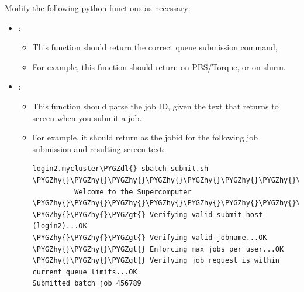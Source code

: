 \documentclass[letterpaper,10pt,english]{sphinxmanual}
\def\PYGZgt{\char`\>}
\def\PYGZdl{\char`\$}
\def\PYGZhy{\char`\-}
\begin{document}
Modify the following python functions as necessary:
\begin{itemize}
\item {} 
:
\begin{itemize}
\item {} 
This function should return the correct queue submission command,

\item {} 
For example, this function should return  on PBS/Torque, or  on slurm.

\end{itemize}

\item {} 
:
\begin{itemize}
\item {} 
This function should parse the job ID, given the text that returns to screen when you submit a job.

\item {} 
For example, it should return  as the jobid for the following job submission and resulting screen text:

\begin{Verbatim}[commandchars=\\\{\}]
login2.mycluster\PYGZdl{} sbatch submit.sh
\PYGZhy{}\PYGZhy{}\PYGZhy{}\PYGZhy{}\PYGZhy{}\PYGZhy{}\PYGZhy{}\PYGZhy{}\PYGZhy{}\PYGZhy{}\PYGZhy{}\PYGZhy{}\PYGZhy{}\PYGZhy{}\PYGZhy{}\PYGZhy{}\PYGZhy{}\PYGZhy{}\PYGZhy{}\PYGZhy{}\PYGZhy{}\PYGZhy{}\PYGZhy{}\PYGZhy{}\PYGZhy{}\PYGZhy{}\PYGZhy{}\PYGZhy{}\PYGZhy{}\PYGZhy{}\PYGZhy{}\PYGZhy{}\PYGZhy{}\PYGZhy{}\PYGZhy{}\PYGZhy{}\PYGZhy{}\PYGZhy{}\PYGZhy{}\PYGZhy{}\PYGZhy{}\PYGZhy{}\PYGZhy{}\PYGZhy{}\PYGZhy{}\PYGZhy{}\PYGZhy{}\PYGZhy{}\PYGZhy{}\PYGZhy{}\PYGZhy{}\PYGZhy{}\PYGZhy{}\PYGZhy{}\PYGZhy{}\PYGZhy{}\PYGZhy{}\PYGZhy{}\PYGZhy{}\PYGZhy{}\PYGZhy{}\PYGZhy{}\PYGZhy{}\PYGZhy{}\PYGZhy{}
          Welcome to the Supercomputer
\PYGZhy{}\PYGZhy{}\PYGZhy{}\PYGZhy{}\PYGZhy{}\PYGZhy{}\PYGZhy{}\PYGZhy{}\PYGZhy{}\PYGZhy{}\PYGZhy{}\PYGZhy{}\PYGZhy{}\PYGZhy{}\PYGZhy{}\PYGZhy{}\PYGZhy{}\PYGZhy{}\PYGZhy{}\PYGZhy{}\PYGZhy{}\PYGZhy{}\PYGZhy{}\PYGZhy{}\PYGZhy{}\PYGZhy{}\PYGZhy{}\PYGZhy{}\PYGZhy{}\PYGZhy{}\PYGZhy{}\PYGZhy{}\PYGZhy{}\PYGZhy{}\PYGZhy{}\PYGZhy{}\PYGZhy{}\PYGZhy{}\PYGZhy{}\PYGZhy{}\PYGZhy{}\PYGZhy{}\PYGZhy{}\PYGZhy{}\PYGZhy{}\PYGZhy{}\PYGZhy{}\PYGZhy{}\PYGZhy{}\PYGZhy{}\PYGZhy{}\PYGZhy{}\PYGZhy{}\PYGZhy{}\PYGZhy{}\PYGZhy{}\PYGZhy{}\PYGZhy{}\PYGZhy{}\PYGZhy{}\PYGZhy{}\PYGZhy{}\PYGZhy{}\PYGZhy{}\PYGZhy{}
\PYGZhy{}\PYGZhy{}\PYGZgt{} Verifying valid submit host (login2)...OK
\PYGZhy{}\PYGZhy{}\PYGZgt{} Verifying valid jobname...OK
\PYGZhy{}\PYGZhy{}\PYGZgt{} Enforcing max jobs per user...OK
\PYGZhy{}\PYGZhy{}\PYGZgt{} Verifying job request is within current queue limits...OK
Submitted batch job 456789
\end{Verbatim}


\end{itemize}
\end{itemize}
\end{document}
